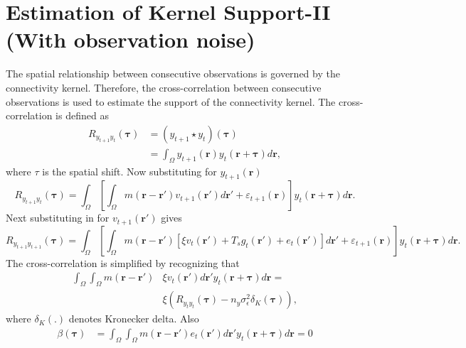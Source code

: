 \documentclass[]{article}
\begin{document}
\section*{Estimation of Kernel Support-II (With observation noise)}
The spatial relationship between consecutive observations is governed by the connectivity kernel. Therefore, the cross-correlation between consecutive observations is used to estimate the support of the connectivity kernel. The cross-correlation is defined as
\begin{align}
	R_{y_{t+1}y_t}(\boldsymbol{\tau})& =(y_{t+1} \star y_t)(\boldsymbol\tau) \nonumber \\
 &=\int_{\Omega} y_{t+1}(\mathbf{r}) y_t(\mathbf{r}+\boldsymbol{\tau}) d\mathbf{r},
\end{align}
where $\tau$ is the spatial shift. Now substituting for $y_{t+1}(\mathbf{r})$ 
\begin{equation}
	R_{y_{t+1}y_t}(\boldsymbol{\tau}) = \int_{\Omega}\left[ \int_{\Omega} m(\mathbf{r}-\mathbf{r}')v_{t+1}(\mathbf{r}')d\mathbf{r}'+\varepsilon_{t+1}(\mathbf r)\right]  y_t(\mathbf{r}+\boldsymbol{\tau}) d\mathbf{r}.
\end{equation}
Next  substituting in for $v_{t+1}(\mathbf{r}')$ gives
\begin{equation}
	R_{y_{t+1}y_{t+1}}(\boldsymbol{\tau}) = \int_{\Omega}\left[ \int_{\Omega} m(\mathbf{r}-\mathbf{r}')\left[ \xi v_t\left(\mathbf{r}'\right) + 
	T_s g_t(\mathbf{r}') 
	+ e_t\left(\mathbf{r}'\right)\right] d\mathbf{r}' +\varepsilon_{t+1}(\mathbf{r})\right] y_{t}(\mathbf{r}+\boldsymbol{\tau}) d\mathbf{r}.
\end{equation}
The cross-correlation is simplified by recognizing that 
\begin{align}
	\int_{\Omega}\int_{\Omega} m(\mathbf{r}-\mathbf{r}')&\xi v_t(\mathbf{r}')d\mathbf{r}'y_t(\mathbf{r}+\boldsymbol{\tau}) d\mathbf{r} = \nonumber \\ 
 &\xi \left(R_{y_ty_t}(\boldsymbol{\tau})-n_y\sigma_{\epsilon}^2  \delta_{K}\left(\boldsymbol\tau\right)\right),
\end{align}
where $\delta_{K}\left(.\right)$ denotes Kronecker delta. Also  
\begin{align}
	\beta(\boldsymbol{\tau}) &= \int_{\Omega}\int_{\Omega} m(\mathbf{r}-\mathbf{r}') e_t(\mathbf{r}') d\mathbf{r}'y_t(\mathbf{r}+\boldsymbol{\tau}) d\mathbf{r}=0 %
\end{align}
\end{document}
